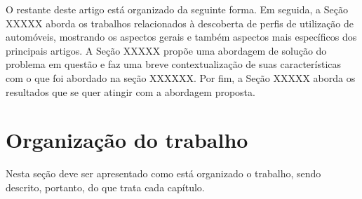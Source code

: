 O restante deste artigo está organizado da seguinte forma. Em seguida, a Seção XXXXX aborda os trabalhos relacionados à descoberta de perfis de utilização de automóveis, mostrando os aspectos gerais e também aspectos mais específicos dos principais artigos. A Seção XXXXX propõe uma abordagem de solução do problema em questão e faz uma breve contextualização de suas características com o que foi abordado na seção XXXXXX. Por fim, a Seção XXXXX aborda os resultados que se quer atingir com a abordagem proposta.

\section{Organização do trabalho}

Nesta seção deve ser apresentado como está organizado o trabalho, sendo descrito, portanto, do que trata cada capítulo.